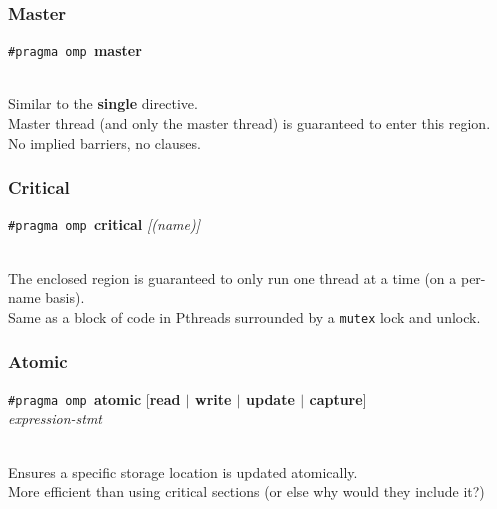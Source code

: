 \documentclass[aspectratio=43]{beamer}
\newenvironment{changemargin}[1]{%
  \begin{list}{}{%
    \setlength{\topsep}{0pt}%
    \setlength{\leftmargin}{#1}%
    \setlength{\rightmargin}{1em}
    \setlength{\listparindent}{\parindent}%
    \setlength{\itemindent}{\parindent}%
    \setlength{\parsep}{\parskip}%
  }%
  \item[]}{\end{list}}
\begin{document}
\begin{frame}[fragile]
  \frametitle{Master}

  \begin{changemargin}{2.5cm}
  \begin{center}
    {\tt \#pragma omp }{\bf master}
  \end{center}
~\\
    Similar to the {\bf single} directive.\\[1em]
    Master thread (and only the master thread) is guaranteed to enter this region.\\[1em]
    No implied barriers, no clauses.\\[1em]
  \end{changemargin}

\end{frame}

\begin{frame}[fragile]
  \frametitle{Critical}

  \begin{changemargin}{2.5cm}
  \begin{center}
    {\tt \#pragma omp }{\bf critical} {\it [(name)]}
  \end{center}~\\

    The enclosed region is guaranteed to only run one thread at a time
      (on a per-name basis).\\[1em]
    Same as a block of code in Pthreads surrounded by a {\tt mutex} lock
      and unlock.
  \end{changemargin}

\end{frame}

\begin{frame}[fragile]
  \frametitle{Atomic}

  \begin{changemargin}{1.5cm}
  \begin{center}
    {\tt \#pragma omp }{\bf atomic} [{\bf read $\mid$ write $\mid$ update $\mid$ capture}]\\
    {\it expression-stmt}
  \end{center}~\\
  
    Ensures a specific storage location is updated atomically.\\[1em]
    More efficient than using critical sections (or else why would they
      include it?)\\[2em]

  \end{changemargin}

\end{frame}
\end{document}
